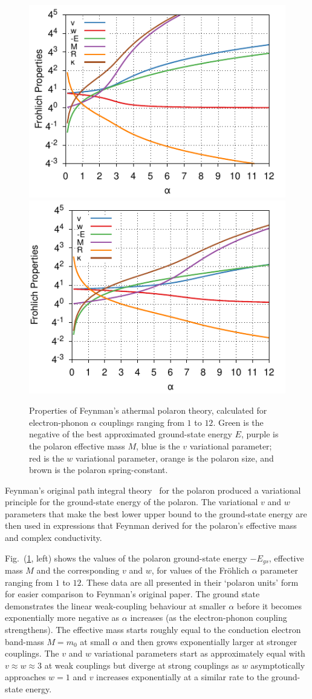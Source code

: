 \begin{figure}
\centering
\includegraphics[width=.49\textwidth]{chapters/background/figures/frohlich-2d-alpha-0to12-COLOUR.pdf}
\includegraphics[width=.49\textwidth]{chapters/background/figures/frohlich-3d-alpha-0to12-COLOUR.pdf}
\caption{Properties of Feynman's athermal polaron theory, calculated for electron-phonon $\alpha$ couplings ranging from $1$ to $12$. Green is the negative of the best approximated ground-state energy $E$, purple is the polaron effective mass $M$, blue is the $v$ variational parameter; red is the $w$ variational parameter, orange is the polaron size, and brown is the polaron spring-constant.}
\label{fig-2251-1:athermaltheory}
\end{figure}

Feynman's original path integral theory~\cite{feynman_slow_1955} for the polaron produced a variational principle for the ground-state energy of the polaron. The variational $v$ and $w$ parameters that make the best lower upper bound to the ground-state energy are then used in expressions that Feynman derived for the polaron's effective mass and complex conductivity. 

Fig.~(\ref{fig-2251-1:athermaltheory}, left) shows the values of the polaron ground-state energy $-E_{gs}$, effective mass $M$ and the corresponding $v$ and $w$, for values of the Fr\"ohlich $\alpha$ parameter ranging from $1$ to $12$. These data are all presented in their `polaron units' form for easier comparison to Feynman's original paper. The ground state demonstrates the linear weak-coupling behaviour at smaller $\alpha$ before it becomes exponentially more negative as $\alpha$ increases (as the electron-phonon coupling strengthens). The effective mass starts roughly equal to the conduction electron band-mass $M = m_0 $ at small $\alpha$ and then grows exponentially larger at stronger couplings. The $v$ and $w$ variational parameters start as approximately equal with $v \approx w \approx 3$ at weak couplings but diverge at strong couplings as $w$ asymptotically approaches $w = 1$ and $v$ increases exponentially at a similar rate to the ground-state energy. 

